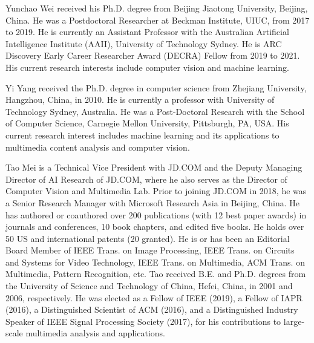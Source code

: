 \documentclass[journal]{IEEEtran}
\begin{document}
\vfill
\begin{IEEEbiography}
{Yunchao Wei} received his Ph.D. degree from Beijing Jiaotong University, Beijing, China. He was a Postdoctoral Researcher at Beckman Institute, UIUC, from 2017 to 2019. He is currently an Assistant Professor with the Australian Artificial Intelligence Institute (AAII), University of Technology Sydney. He is ARC Discovery Early Career Researcher Award (DECRA) Fellow from 2019 to 2021. 
His current research interests include computer vision and machine learning.
\end{IEEEbiography}

\vfill
\begin{IEEEbiography}{Yi Yang} received the Ph.D. degree in computer
science from Zhejiang University, Hangzhou, China, in 2010. He is currently a professor with University of Technology Sydney, Australia.
He was a Post-Doctoral Research with the School of Computer Science, Carnegie Mellon University, Pittsburgh, PA, USA. His current research interest includes machine learning and its applications to multimedia content analysis and computer vision. \end{IEEEbiography}


\vfill
\begin{IEEEbiography}{Tao Mei}  is a Technical Vice
President with JD.COM and the Deputy Managing
Director of AI Research of JD.COM, where he also serves
as the Director of Computer Vision and Multimedia
Lab. Prior to joining JD.COM in 2018, he was a
Senior Research Manager with Microsoft Research
Asia in Beijing, China. He has authored or coauthored over 200 publications (with 12 best paper
awards) in journals and conferences, 10 book chapters, and edited five books. He holds over 50 US and
international patents (20 granted). He is or has been
an Editorial Board Member of IEEE Trans. on Image Processing, IEEE Trans.
on Circuits and Systems for Video Technology, IEEE Trans. on Multimedia,
ACM Trans. on Multimedia, Pattern Recognition, etc. Tao received B.E. and
Ph.D. degrees from the University of Science and Technology of China,
Hefei, China, in 2001 and 2006, respectively. He was elected as a Fellow of
IEEE (2019), a Fellow of IAPR (2016), a Distinguished Scientist of ACM
(2016), and a Distinguished Industry Speaker of IEEE Signal Processing
Society (2017), for his contributions to large-scale multimedia analysis and
applications.
\end{IEEEbiography}
\end{document}
